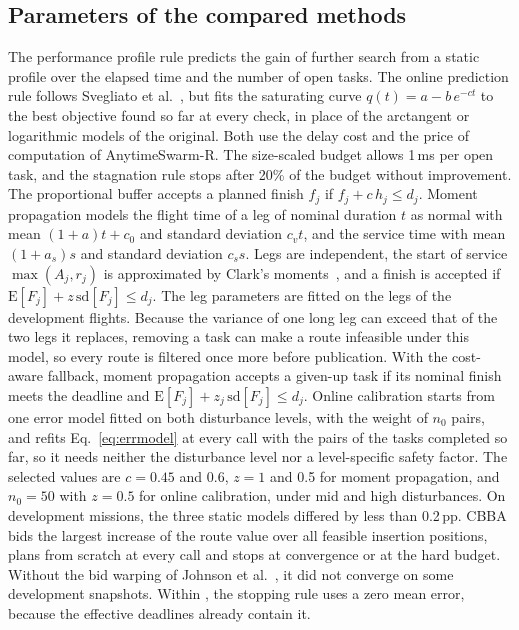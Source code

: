 \subsection{Parameters of the compared methods}\label{sec:Sparams}
The performance profile rule predicts the gain of further search from a static profile over the elapsed time and the
number of open tasks. The online prediction rule follows Svegliato et al.~\cite{svegliato2018meta}, but fits the
saturating curve $q(t)=a-b\,e^{-ct}$ to the best objective found so far at every check, in place of the arctangent or
logarithmic models of the original. Both use the delay cost and the price of computation of AnytimeSwarm-R. The size-scaled budget allows 1\,ms
per open task, and the stagnation rule stops after 20\% of the budget without improvement. The proportional buffer
accepts a planned finish $f_j$ if $f_j+c\,h_j\le d_j$. Moment propagation models the flight time of a leg of nominal
duration $t$ as normal with mean $(1+a)t+c_0$ and standard deviation $c_vt$, and the service time with mean $(1+a_s)s$
and standard deviation $c_ss$. Legs are independent, the start of service $\max(A_j,r_j)$ is approximated by Clark's
moments~\cite{clark1961greatest}, and a finish is accepted if $\mathrm{E}[F_j]+z\,\mathrm{sd}[F_j]\le d_j$. The leg
parameters are fitted on the legs of the development flights. Because the variance of one long leg can exceed that of
the two legs it replaces, removing a task can make a route infeasible under this model, so every route is filtered once
more before publication. With the cost-aware fallback, moment propagation accepts a given-up task if its nominal finish
meets the deadline and $\mathrm{E}[F_j]+z_j\,\mathrm{sd}[F_j]\le d_j$. Online calibration starts from one error model
fitted on both disturbance levels, with the weight of $n_0$ pairs, and refits Eq.~\eqref{eq:errmodel} at every call with
the pairs of the tasks completed so far, so it needs neither the disturbance level nor a level-specific safety factor.
The selected values are $c=0.45$ and 0.6, $z=1$ and 0.5 for moment propagation, and $n_0=50$ with $z=0.5$ for online
calibration, under mid and high disturbances. On development missions, the three static models differed by less than
0.2\,pp. CBBA bids the largest increase of the route value over all feasible insertion positions, plans from scratch at
every call and stops at convergence or at the hard budget. Without the bid warping of Johnson et
al.~\cite{johnson2012nonsubmodular}, it did not converge on some development snapshots. Within \mname{}, the stopping
rule uses a zero mean error, because the effective deadlines already contain it.

